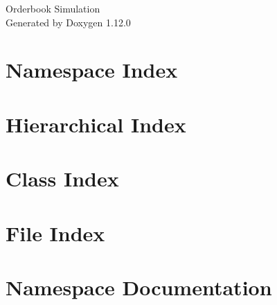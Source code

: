 \documentclass[twoside]{book}
\newcommand{\+}{\discretionary{\mbox{\scriptsize$\hookleftarrow$}}{}{}}
\newcommand{\clearemptydoublepage}{%
    \newpage{\pagestyle{empty}\cleardoublepage}%
  }
\begin{document}
  \raggedbottom
    \hypersetup{pageanchor=false,
                bookmarksnumbered=true,
                pdfencoding=unicode
               }
  \begin{titlepage}
  \vspace*{7cm}
  \begin{center}%
  {\Large Orderbook Simulation}\\
  \vspace*{1cm}
  {\large Generated by Doxygen 1.12.0}\\
  \end{center}
  \end{titlepage}
  \clearemptydoublepage
  \tableofcontents
  \clearemptydoublepage
  \hypersetup{pageanchor=true}


\chapter{Namespace Index}

\chapter{Hierarchical Index}

\chapter{Class Index}

\chapter{File Index}

\chapter{Namespace Documentation}










\end{document}

